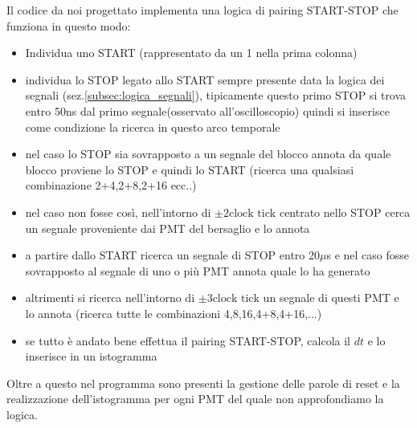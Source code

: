 \documentclass[10pt,a4paper]{article}
\begin{document}
\begin{flushleft}
Il codice da noi progettato implementa una logica di pairing START-STOP che funziona in questo modo:
\begin{itemize}
    \item Individua uno START (rappresentato da un 1 nella prima colonna)
    \item individua lo STOP legato allo START sempre presente data la logica dei segnali (sez.\ref{subsec:logica_segnali}), tipicamente questo primo STOP si trova entro 50ns dal primo segnale(osservato all'oscilloscopio) quindi si inserisce come condizione la ricerca in questo arco temporale 
    \item nel caso lo STOP sia sovrapposto a un segnale del blocco annota da quale blocco proviene lo STOP e quindi lo START (ricerca una qualsiasi combinazione 2+4,2+8,2+16 ecc..)
    \item nel caso non fosse così, nell'intorno di $\pm 2\text{clock tick}$ centrato nello STOP cerca un segnale proveniente dai PMT del bersaglio e lo annota
    \item a partire dallo START ricerca un segnale di STOP entro 20$\mu $s e nel caso fosse sovrapposto al segnale di uno o più PMT annota quale lo ha generato
    \item altrimenti si ricerca nell'intorno di $\pm 3\text{clock tick}$ un segnale di questi PMT e lo annota (ricerca tutte le combinazioni 4,8,16,4+8,4+16,...)
    \item se tutto è andato bene effettua il pairing START-STOP, calcola il $dt$ e lo inserisce in un istogramma 
\end{itemize}
Oltre a questo nel programma sono presenti la gestione delle parole di reset e la realizzazione dell'istogramma per ogni PMT del quale non approfondiamo la logica.\\





    
\end{flushleft}

\newpage
\end{document}
